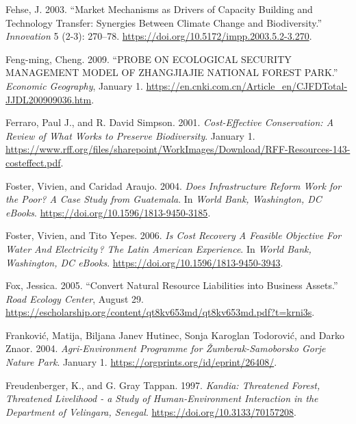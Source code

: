 \begin{CSLReferences}{1}{1}
Fehse, J. 2003. {``Market Mechanisms as Drivers of Capacity Building and
Technology Transfer: Synergies Between Climate Change and
Biodiversity.''} \emph{Innovation} 5 (2-3): 270--78.
\url{https://doi.org/10.5172/impp.2003.5.2-3.270}.

Feng-ming, Cheng. 2009. {``PROBE ON ECOLOGICAL SECURITY MANAGEMENT MODEL
OF ZHANGJIAJIE NATIONAL FOREST PARK.''} \emph{Economic Geography},
January 1.
\url{https://en.cnki.com.cn/Article_en/CJFDTotal-JJDL200909036.htm}.

Ferraro, Paul J., and R. David Simpson. 2001. \emph{Cost-Effective
Conservation: A Review of What Works to Preserve Biodiversity}. January
1.
\url{https://www.rff.org/files/sharepoint/WorkImages/Download/RFF-Resources-143-costeffect.pdf}.

Foster, Vivien, and Caridad Araujo. 2004. \emph{Does Infrastructure
Reform Work for the Poor? A Case Study from Guatemala}. In \emph{World
Bank, Washington, DC eBooks}.
\url{https://doi.org/10.1596/1813-9450-3185}.

Foster, Vivien, and Tito Yepes. 2006. \emph{Is Cost Recovery A Feasible
Objective For Water And Electricity\,? The Latin American Experience}.
In \emph{World Bank, Washington, DC eBooks}.
\url{https://doi.org/10.1596/1813-9450-3943}.

Fox, Jessica. 2005. {``Convert Natural Resource Liabilities into
Business Assets.''} \emph{Road Ecology Center}, August 29.
\url{https://escholarship.org/content/qt8kv653md/qt8kv653md.pdf?t=krni3s}.

Franković, Matija, Biljana Janev Hutinec, Sonja Karoglan Todorović, and
Darko Znaor. 2004. \emph{Agri-Environment Programme for
Žumberak-Samoborsko Gorje Nature Park}. January 1.
\url{https://orgprints.org/id/eprint/26408/}.

Freudenberger, K., and G. Gray Tappan. 1997. \emph{Kandia: Threatened
Forest, Threatened Livelihood - a Study of Human-Environment Interaction
in the Department of Velingara, Senegal}.
\url{https://doi.org/10.3133/70157208}.


\end{CSLReferences}
